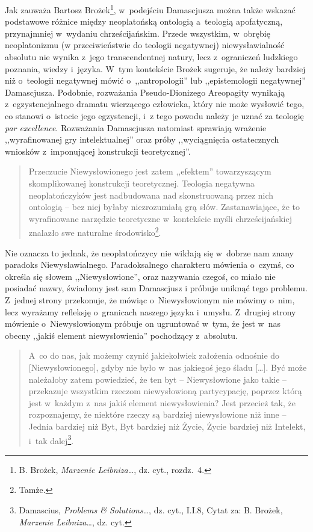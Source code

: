 Jak zauważa Bartosz Brożek\footnote{B. Brożek, \textit{Marzenie Leibniza}\ldots, dz. cyt., rozdz.~4.}, w~podejściu Damascjusza można także wskazać podstawowe różnice między neoplatońską ontologią a~teologią apofatyczną, przynajmniej w~wydaniu chrześcijańskim. Przede wszystkim, w~obrębię neoplatonizmu (w przeciwieństwie do teologii negatywnej) niewysławialność absolutu nie wynika z~jego transcendentnej natury, lecz z~ograniczeń ludzkiego poznania, wiedzy i~języka. W~tym kontekście Brożek sugeruje, że należy bardziej niż o~teologii negatywnej mówić o~,,antropologii'' lub ,,epistemologii negatywnej'' Damascjusza. Podobnie, rozważania Pseudo-Dionizego Areopagity wynikają z~egzystencjalnego dramatu wierzącego człowieka, który nie może wysłowić tego, co stanowi o~istocie jego egzystencji, i~z tego powodu należy je uznać za teologię \textit{par excellence}. Rozważania Damascjusza natomiast sprawiają wrażenie ,,wyrafinowanej gry intelektualnej'' oraz próby ,,wyciągnięcia ostatecznych wniosków z~imponującej konstrukcji teoretycznej''.

\begin{quote}
Przeczucie Niewysłowionego jest zatem ,,efektem'' towarzyszącym skomplikowanej konstrukcji teoretycznej. Teologia negatywna neoplatończyków jest nadbudowana nad skonstruowaną przez nich ontologią -- bez niej byłaby niezrozumiałą grą słów. Zastanawiające, że to wyrafinowane narzędzie teoretyczne w~kontekście myśli chrześcijańskiej znalazło swe naturalne środowisko\footnote{Tamże.}.
\end{quote}

Nie oznacza to jednak, że neoplatończycy nie wikłają się w~dobrze nam znany paradoks Niewysławialnego. Paradoksalnego charakteru mówienia o~czymś, co określa się słowem ,,Niewysłowione'', oraz nazywania czegoś, co miało nie posiadać nazwy, świadomy jest sam Damascjusz i próbuje uniknąć tego problemu. Z~jednej strony przekonuje, że mówiąc o~Niewysłowionym nie mówimy o~nim, lecz wyrażamy refleksję o~granicach naszego języka i~umysłu. Z~drugiej strony mówienie o~Niewysłowionym próbuje on ugruntować w~tym, że jest w~nas obecny ,,jakiś element niewysłowienia'' pochodzący z~absolutu.

\begin{quote}
A~co do nas, jak możemy czynić jakiekolwiek założenia odnośnie do [Niewysłowionego], gdyby nie było w~nas jakiegoś jego śladu [\ldots]. Być może należałoby zatem powiedzieć, że ten byt -- Niewysłowione jako takie -- przekazuje wszystkim rzeczom niewysłowioną partycypację, poprzez którą jest w~każdym z~nas jakiś element niewysłowienia? Jest przecież tak, że rozpoznajemy, że niektóre rzeczy są bardziej niewysłowione niż inne -- Jednia bardziej niż Byt, Byt bardziej niż Życie, Życie bardziej niż Intelekt, i~tak dalej\footnote{Damascius, \textit{Problems \& Solutions}\ldots, dz. cyt., I.I.8, Cytat za: B. Brożek, \textit{Marzenie Leibniza}\ldots, dz. cyt.}.
\end{quote}

